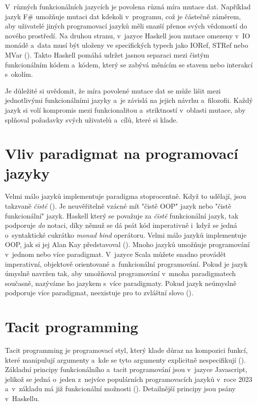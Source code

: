 \documentclass[male, czech]{kithesis}
\begin{document}
V~různých funkcionálních jazycích je povolena různá míra mutace dat.
Například jazyk F\# umožňuje mutaci dat kdekoli v~programu, 
což je částečně záměrem, 
aby uživatelé jiných programovací jazyků měli snazší přenos svých vědomostí do 
nového prostředí.
Na druhou stranu, 
v~jazyce Haskell jsou mutace omezeny v~IO monádě
a~data musí být uloženy 
ve specifických typech jako IORef, STRef nebo MVar (\cite{Jones2010}). 
Takto Haskell pomáhá udržet jasnou separaci mezi čistým funkcionálním kódem a~kódem, 
který se zabývá měnícím se stavem nebo interakcí s~okolím.

Je důležité si uvědomit, 
že míra povolené mutace dat se může lišit mezi jednotlivými funkcionálními jazyky
a~je závislá na jejich návrhu a~filozofii. 
Každý jazyk si volí kompromis mezi funkcionalitou
a~striktností v~oblasti mutace, 
aby splňoval požadavky svých uživatelů a~cílů, 
které si klade.

\section{Vliv paradigmat na programovací jazyky}
Velmi málo jazyků implementuje paradigma stoprocentně. 
Když to udělají, 
jsou takzvaně \textit{čisté} (\cite{ProgrammingParadigms}). 
Je neuvěřitelně vzácné mít "čistě OOP" jazyk nebo 
"čistě funkcionální" jazyk. 
Haskell který se považuje za \textit{čistě} funkcionální jazyk,
tak podporuje \textit{do} notaci, 
díky němuž se dá psát kód imperativně
i~když se jedná o~syntaktické cukrátko \textit{monad bind} operátoru.
Velmi málo jazyků implementuje OOP, 
jak si jej Alan Kay představoval (\cite{ProgrammingParadigms}).
Mnoho jazyků umožňuje programování v~jednom nebo více paradigmat. 
V~jazyce Scala můžete snadno provádět imperativní, 
objektově orientované a~funkcionální programování. 
Pokud je jazyk úmyslně navržen tak, 
aby umožňoval programování v~mnoha paradigmatech současně, 
nazýváme ho jazykem s~více paradigmaty. 
Pokud jazyk neúmyslně podporuje více paradigmat, 
neexistuje pro to zvláštní slovo (\cite{ProgrammingParadigms}).

\section{Tacit programming}

Tacit programming je programovací styl, 
který klade důraz na kompozici funkcí, 
které manipulují argumenty
a~kde se tyto argumenty explicitně nespecifikují (\cite{Barros2005}).
Základní principy funkcionálního a~tacit programování jsou v~jazyce Javascript,
jelikož se jedná o~jeden z~nejvíce populárních programovacích jazyků v~roce 2023
a~v~základu má již funkcionální možnosti (\cite{StackSurvey}).
Detailnější principy jsou psány v~Haskellu.
\end{document}
